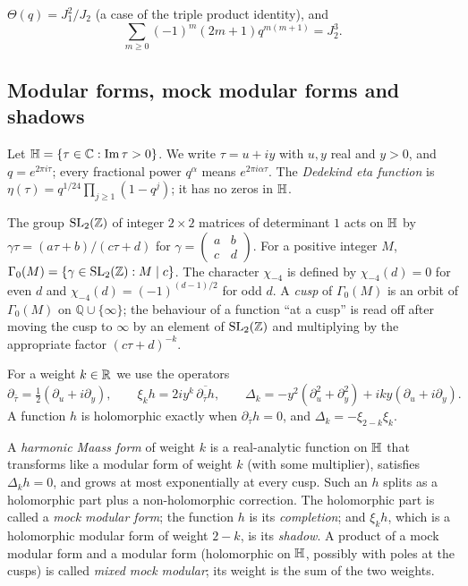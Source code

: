 \begin{fact}[Jacobi]\label{fact:jacobi}
$\Theta(q)=J_1^2/J_2$ (a case of the triple product identity), and
\[
\sum_{m\ge0}(-1)^m(2m+1)q^{m(m+1)}=J_2^3 .
\]
\end{fact}

\subsection{Modular forms, mock modular forms and shadows}\label{sec:modular}
Let $\mathbb{H}=\{\tau\in\mathbb{C}:\operatorname{Im}\tau>0\}$. We write $\tau=u+iy$ with $u,y$ real and
$y>0$, and $q=e^{2\pi i\tau}$; every fractional power $q^\alpha$ means
$e^{2\pi i\alpha\tau}$. The \emph{Dedekind eta function} is
$\eta(\tau)=q^{1/24}\prod_{j\ge1}(1-q^j)$; it has no zeros in $\mathbb{H}$.

The group $\mathrm{SL}_2(\mathbb{Z})$ of integer $2\times2$ matrices of determinant
$1$ acts on $\mathbb{H}$ by $\gamma\tau=(a\tau+b)/(c\tau+d)$ for
$\gamma=\left(\begin{smallmatrix}a&b\\c&d\end{smallmatrix}\right)$. For a
positive integer $M$,
$\Gamma_0(M)=\{\gamma\in\mathrm{SL}_2(\mathbb{Z}):M\mid c\}$. The character
$\chi_{-4}$ is defined by $\chi_{-4}(d)=0$ for even $d$ and
$\chi_{-4}(d)=(-1)^{(d-1)/2}$ for odd $d$. A \emph{cusp} of $\Gamma_0(M)$ is
an orbit of $\Gamma_0(M)$ on $\mathbb{Q}\cup\{\infty\}$; the behaviour of a
function ``at a cusp'' is read off after moving the cusp to $\infty$ by an
element of $\mathrm{SL}_2(\mathbb{Z})$ and multiplying by the appropriate factor
$(c\tau+d)^{-k}$.

For a weight $k\in\mathbb{R}$ we use the operators
\[
\partial_{\bar\tau}=\tfrac12(\partial_u+i\partial_y),\qquad
\xi_kh=2iy^k\,\overline{\partial_{\bar\tau}h},\qquad
\Delta_k=-y^2(\partial_u^2+\partial_y^2)+iky(\partial_u+i\partial_y).
\]
A function $h$ is holomorphic exactly when $\partial_{\bar\tau}h=0$, and
$\Delta_k=-\xi_{2-k}\xi_k$.

A \emph{harmonic Maass form} of weight $k$ is a real-analytic function on $\mathbb{H}$
that transforms like a modular form of weight $k$ (with some multiplier),
satisfies $\Delta_kh=0$, and grows at most exponentially at every cusp. Such
an $h$ splits as a holomorphic part plus a non-holomorphic correction. The
holomorphic part is called a \emph{mock modular form}; the function $h$ is its
\emph{completion}; and $\xi_kh$, which is a holomorphic modular form of weight
$2-k$, is its \emph{shadow}. A product of a mock modular form and a modular
form (holomorphic on $\mathbb{H}$, possibly with poles at the cusps) is called
\emph{mixed mock modular}; its weight is the sum of the two weights.

